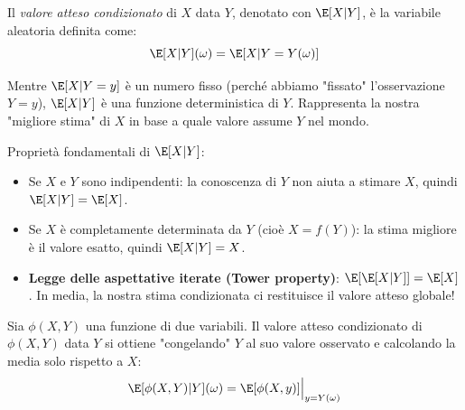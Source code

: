 \begin{definition}
Il \emph{valore atteso condizionato} di $X$ data $Y$, denotato con $\E[X|Y]$, è la variabile aleatoria definita come:
\[ \E[X|Y](\omega) = \E[X | Y = Y(\omega)] \]
\end{definition}

\begin{spiegazione}
    Mentre $\E[X|Y=y]$ è un numero fisso (perché abbiamo "fissato" l'osservazione $Y=y$), $\E[X|Y]$ è una funzione deterministica di $Y$. Rappresenta la nostra "migliore stima" di $X$ in base a quale valore assume $Y$ nel mondo.
\end{spiegazione}

Proprietà fondamentali di $\E[X|Y]$:
\begin{itemize}
    \item Se $X$ e $Y$ sono indipendenti: la conoscenza di $Y$ non aiuta a stimare $X$, quindi $\E[X|Y] = \E[X]$.
    \item Se $X$ è completamente determinata da $Y$ (cioè $X = f(Y)$): la stima migliore è il valore esatto, quindi $\E[X|Y] = X$.
    \item \textbf{Legge delle aspettative iterate (Tower property)}: $\E[\E[X|Y]] = \E[X]$. In media, la nostra stima condizionata ci restituisce il valore atteso globale!
\end{itemize}

\begin{theorem}
Sia $\phi(X,Y)$ una funzione di due variabili. Il valore atteso condizionato di $\phi(X,Y)$ data $Y$ si ottiene "congelando" $Y$ al suo valore osservato e calcolando la media solo rispetto a $X$:
\[ \E[\phi(X,Y)|Y](\omega) = \E[\phi(X, y)]\Big|_{y=Y(\omega)} \]
\end{theorem}
